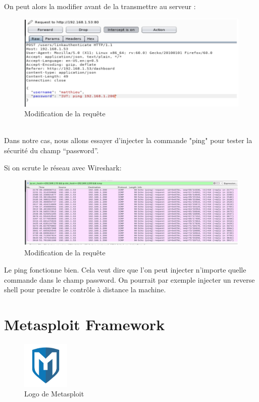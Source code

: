 \noindent On peut alors la modifier avant de la transmettre au serveur :
\begin{figure}[htp!]
  \centering
  \setlength\figureheight{7cm}
  \setlength\figurewidth{9cm}
  \includegraphics[width=1\textwidth]{oui/Ancien/imangeancien/burpsuite/burpsuite7.PNG}
  \caption{Modification de la requête}
  \label{fig:courbe-tikz}
\end{figure}\\
Dans notre cas, nous allons essayer d’injecter la commande "ping" pour tester la sécurité du champ “password”.\\

\newpage

\noindent Si on scrute le réseau avec Wireshark:
\begin{figure}[htp!]
  \centering
  \setlength\figureheight{7cm}
  \setlength\figurewidth{9cm}
  \includegraphics[width=1\textwidth]{oui/Ancien/imangeancien/burpsuite/burpsuite8.PNG}
  \caption{Modification de la requête}
  \label{fig:courbe-tikz}
\end{figure}

Le ping fonctionne bien. Cela veut dire que l'on peut injecter n’importe quelle commande dans le champ password. On pourrait par exemple injecter un reverse shell pour prendre le contrôle à distance la machine.


\section{Metasploit Framework}
\begin{figure}[htp!]
  \centering
  \setlength\figureheight{7cm}
  \setlength\figurewidth{9cm}
  \includegraphics[width=0.2\textwidth]{oui/Ancien/imangeancien/metasploit.png}
  \caption{Logo de Metasploit}
  \label{fig:courbe-tikz}
\end{figure}

